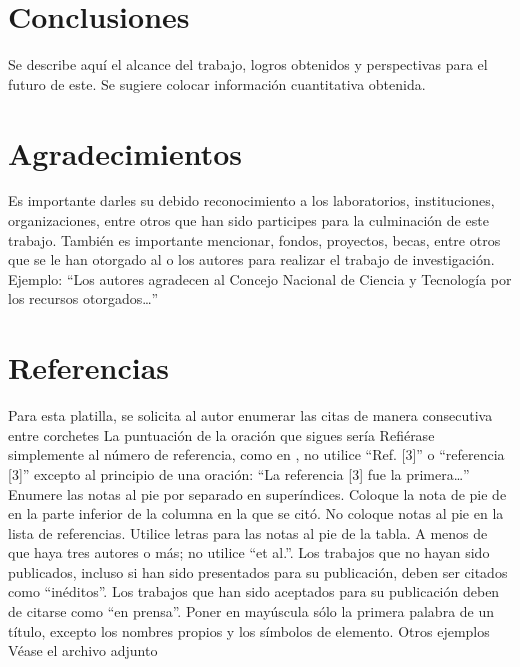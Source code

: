     \section{Conclusiones}
    
    Se describe aquí el alcance del trabajo, logros obtenidos y perspectivas para el futuro de este. Se sugiere colocar información cuantitativa obtenida.
    
    \section{Agradecimientos}
    
    Es importante darles su debido reconocimiento a los laboratorios, instituciones, organizaciones, entre otros que han sido participes para la culminación de este trabajo. También es importante mencionar, fondos, proyectos, becas, entre otros que se le han otorgado al o los autores para realizar el trabajo de investigación. Ejemplo: “Los autores agradecen al Concejo Nacional de Ciencia y Tecnología por los recursos otorgados…”
    
    \section*{Referencias}
    Para esta platilla, se solicita al autor enumerar las citas de manera consecutiva entre corchetes 
    La puntuación de la oración que sigues sería  
    Refiérase simplemente al número de referencia, como en , no utilice “Ref. [3]” o “referencia [3]” excepto al principio de una oración: “La referencia [3] fue la primera…”
    Enumere las notas al pie por separado en superíndices. Coloque la nota de pie de en la parte inferior de la columna en la que se citó. No coloque notas al pie en la lista de referencias. Utilice letras para las notas al pie de la tabla.
    A menos de que haya tres autores o más; no utilice “et al.”. Los trabajos que no hayan sido publicados, incluso si han sido presentados para su publicación, deben ser citados como “inéditos”. Los trabajos que han sido aceptados para su publicación deben de citarse como “en prensa”. Poner en mayúscula sólo la primera palabra de un título, excepto los nombres propios y los símbolos de elemento. 
    Otros ejemplos 
    Véase el archivo adjunto 
    
    
